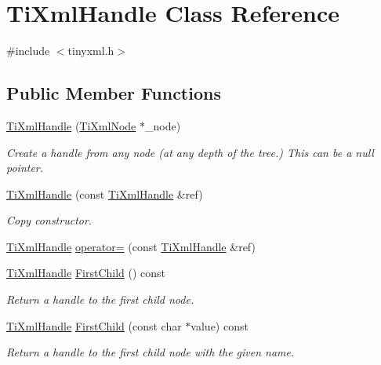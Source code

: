 \hypertarget{class_ti_xml_handle}{}\section{Ti\+Xml\+Handle Class Reference}
\label{class_ti_xml_handle}


{\ttfamily \#include $<$tinyxml.\+h$>$}

\subsection*{Public Member Functions}
\begin{DoxyCompactItemize}
\item 
\hyperlink{class_ti_xml_handle_aba18fd7bdefb942ecdea4bf4b8e29ec8}{Ti\+Xml\+Handle} (\hyperlink{class_ti_xml_node}{Ti\+Xml\+Node} $\ast$\+\_\+node)
\begin{DoxyCompactList}\small\item\em Create a handle from any node (at any depth of the tree.) This can be a null pointer. \end{DoxyCompactList}\item 
\hyperlink{class_ti_xml_handle_a236d7855e1e56ccc7b980630c48c7fd7}{Ti\+Xml\+Handle} (const \hyperlink{class_ti_xml_handle}{Ti\+Xml\+Handle} \&ref)
\begin{DoxyCompactList}\small\item\em Copy constructor. \end{DoxyCompactList}\item 
\hyperlink{class_ti_xml_handle}{Ti\+Xml\+Handle} \hyperlink{class_ti_xml_handle_ad8e5dcf6a87882674203157f29f8e4db}{operator=} (const \hyperlink{class_ti_xml_handle}{Ti\+Xml\+Handle} \&ref)
\item 
\hyperlink{class_ti_xml_handle}{Ti\+Xml\+Handle} \hyperlink{class_ti_xml_handle_afb1b4c0eda970b320dfd262304cc1d04}{First\+Child} () const
\begin{DoxyCompactList}\small\item\em Return a handle to the first child node. \end{DoxyCompactList}\item 
\hyperlink{class_ti_xml_handle}{Ti\+Xml\+Handle} \hyperlink{class_ti_xml_handle_a586ebaca4a4d0909db65a765d95d5e59}{First\+Child} (const char $\ast$value) const
\begin{DoxyCompactList}\small\item\em Return a handle to the first child node with the given name. \end{DoxyCompactList}\item 

\end{DoxyCompactItemize}
